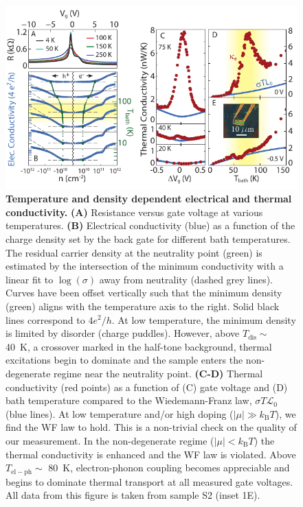 \begin{figure}
\includegraphics[width=6.25in]{figures/Dirac_fluid/Fig1.pdf}
\caption{\textbf{Temperature and density dependent electrical and thermal conductivity.} \textbf{(A)} Resistance versus gate voltage at various temperatures. \textbf{(B)} Electrical conductivity (blue) as a function of the charge density set by the back gate for different bath temperatures. The residual carrier density at the neutrality point (green) is estimated by the intersection of the minimum conductivity with a linear fit to $\log(\sigma)$ away from neutrality (dashed grey lines). Curves have been offset vertically such that the minimum density (green) aligns with the temperature axis to the right. Solid black lines correspond to $4e^2/h$. At low temperature, the minimum density is limited by disorder (charge puddles). However, above $T_{\mathrm{dis}}\sim$ 40~K, a crossover marked in the half-tone background, thermal excitations begin to dominate and the sample enters the non-degenerate regime near the neutrality point. \textbf{(C-D)} Thermal conductivity (red points) as a function of (C) gate voltage and (D) bath temperature compared to the Wiedemann-Franz law, $\sigma T\mathcal{L}_0$ (blue lines).  At low temperature and/or high doping ($|\mu| \gg k_{\mathrm{B}}T$), we find the WF law to hold.  This is a non-trivial check on the quality of our measurement. In the non-degenerate regime ($|\mu|<k_{\mathrm{B}}T$) the thermal conductivity is enhanced and the WF law is violated. Above $T_{\mathrm{el-ph}}\sim$ 80~K, electron-phonon coupling becomes appreciable and begins to dominate thermal transport at all measured gate voltages.   All data from this figure is taken from sample S2 (inset 1E).}
\label{fig:DF_Fig1}
\end{figure}

